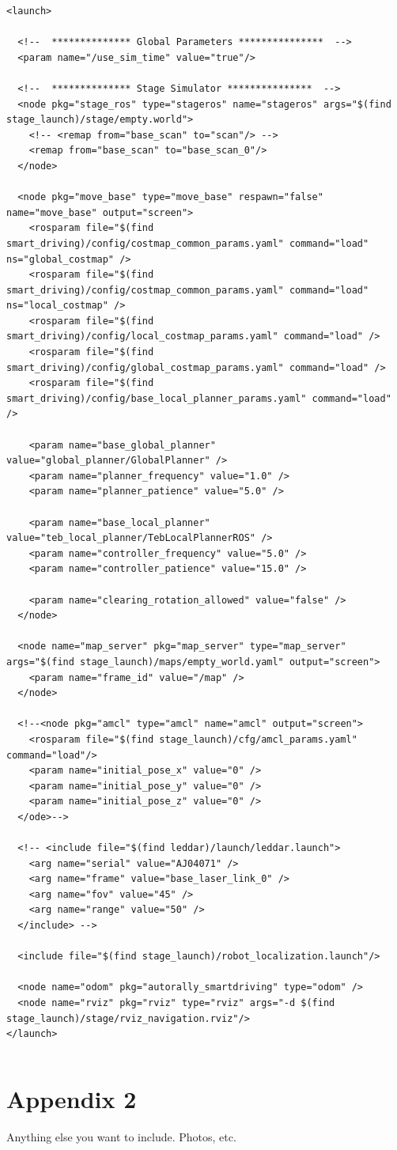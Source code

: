 \documentclass[compsoc,draftclsnofoot,onecolumn,10pt]{IEEEtran}
\begin{document}
\begin{lstlisting}[frame=single,caption={Example Custom Launch File for Stage}]
<launch>

  <!--  ************** Global Parameters ***************  -->
  <param name="/use_sim_time" value="true"/>

  <!--  ************** Stage Simulator ***************  -->
  <node pkg="stage_ros" type="stageros" name="stageros" args="$(find stage_launch)/stage/empty.world">
    <!-- <remap from="base_scan" to="scan"/> -->
    <remap from="base_scan" to="base_scan_0"/>
  </node>

  <node pkg="move_base" type="move_base" respawn="false" name="move_base" output="screen">
    <rosparam file="$(find smart_driving)/config/costmap_common_params.yaml" command="load" ns="global_costmap" />
    <rosparam file="$(find smart_driving)/config/costmap_common_params.yaml" command="load" ns="local_costmap" />
    <rosparam file="$(find smart_driving)/config/local_costmap_params.yaml" command="load" />
    <rosparam file="$(find smart_driving)/config/global_costmap_params.yaml" command="load" />
    <rosparam file="$(find smart_driving)/config/base_local_planner_params.yaml" command="load" />

    <param name="base_global_planner" value="global_planner/GlobalPlanner" />
    <param name="planner_frequency" value="1.0" />
    <param name="planner_patience" value="5.0" />

    <param name="base_local_planner" value="teb_local_planner/TebLocalPlannerROS" />
    <param name="controller_frequency" value="5.0" />
    <param name="controller_patience" value="15.0" />

    <param name="clearing_rotation_allowed" value="false" />
  </node>

  <node name="map_server" pkg="map_server" type="map_server" args="$(find stage_launch)/maps/empty_world.yaml" output="screen">
    <param name="frame_id" value="/map" />
  </node>

  <!--<node pkg="amcl" type="amcl" name="amcl" output="screen">
    <rosparam file="$(find stage_launch)/cfg/amcl_params.yaml" command="load"/>
    <param name="initial_pose_x" value="0" />
    <param name="initial_pose_y" value="0" />
    <param name="initial_pose_z" value="0" />
  </ode>-->

  <!-- <include file="$(find leddar)/launch/leddar.launch">
    <arg name="serial" value="AJ04071" />
    <arg name="frame" value="base_laser_link_0" />
    <arg name="fov" value="45" />
    <arg name="range" value="50" />
  </include> -->

  <include file="$(find stage_launch)/robot_localization.launch"/>

  <node name="odom" pkg="autorally_smartdriving" type="odom" />
  <node name="rviz" pkg="rviz" type="rviz" args="-d $(find stage_launch)/stage/rviz_navigation.rviz"/>
</launch>
\end{lstlisting}

\begin{lstlisting}[frame=single,caption={ROS odom/transform node}]

\end{lstlisting}

\section{Appendix 2}
Anything else you want to include. Photos, etc.
\end{document}
